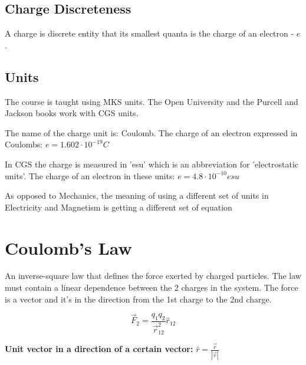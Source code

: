 \documentclass[a4paper]{book}
\begin{document}
	\subsection*{Charge Discreteness}
	
	A charge is discrete entity that its smallest quanta is the charge of an electron - \textbf{$e$}.
	
	\subsection*{Units}
	The course is taught using MKS units. The Open University and the Purcell and Jackson books work with CGS units.
	
	The name of the charge unit is: Coulomb. The charge of an electron expressed in Coulombs: $e = 1.602 \cdot 10^{-19}C$
	
	In CGS the charge is measured in 'esu' which is an abbreviation for 'electrostatic units'. The charge of an electron in these units: $e = 4.8 \cdot 10^{-10} esu$
	
	As opposed to Mechanics, the meaning of using a different set of units in Electricity and Magnetism is getting a different set of equation
	
	\section{Coulomb's Law}
	
	An inverse-square law that defines the force exerted by charged particles. The law must contain a linear dependence between the 2 charges in the system. The force is a vector and it's in the direction from the 1st charge to the 2nd charge.
	
	\begin{equation}
	\vec{F}_2 = \frac{q_1 q_2}{\vec{r}_{12}^2}\hat{r}_{12}
	\end{equation}
	
	\textbf{Unit vector in a direction of a certain vector:} $\hat{r} = \frac{\vec{r}}{|\vec{r}|}$
\end{document}
